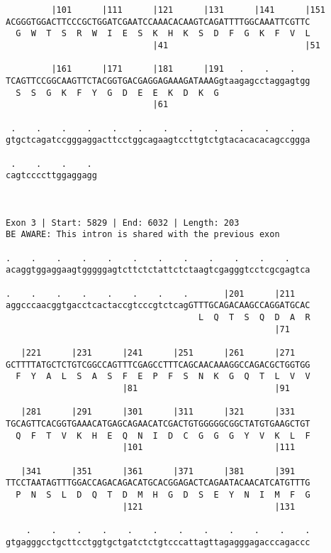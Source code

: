 \documentclass{article}
\begin{document}
\begin{Verbatim}
         |101      |111      |121      |131      |141      |151
ACGGGTGGACTTCCCGCTGGATCGAATCCAAACACAAGTCAGATTTTGGCAAATTCGTTC
  G  W  T  S  R  W  I  E  S  K  H  K  S  D  F  G  K  F  V  L
                             |41                           |51
  
         |161      |171      |181      |191   .    .    .   
TCAGTTCCGGCAAGTTCTACGGTGACGAGGAGAAAGATAAAGgtaagagcctaggagtgg
  S  S  G  K  F  Y  G  D  E  E  K  D  K  G                  
                             |61                            
  
 .    .    .    .    .    .    .    .    .    .    .    .   
gtgctcagatccgggaggacttcctggcagaagtccttgtctgtacacacacagccggga
                                                            
 .    .    .    . 
cagtccccttggaggagg
                  
                  
 
Exon 3 | Start: 5829 | End: 6032 | Length: 203
BE AWARE: This intron is shared with the previous exon
 
.    .    .    .    .    .    .    .    .    .    .    .    
acaggtggaggaagtgggggagtcttctctattctctaagtcgagggtcctcgcgagtca
                                                            
.    .    .    .    .    .    .    .       |201      |211   
aggcccaacggtgacctcactaccgtcccgtctcagGTTTGCAGACAAGCCAGGATGCAC
                                      L  Q  T  S  Q  D  A  R
                                                     |71    
  
   |221      |231      |241      |251      |261      |271   
GCTTTTATGCTCTGTCGGCCAGTTTCGAGCCTTTCAGCAACAAAGGCCAGACGCTGGTGG
  F  Y  A  L  S  A  S  F  E  P  F  S  N  K  G  Q  T  L  V  V
                       |81                           |91    
  
   |281      |291      |301      |311      |321      |331   
TGCAGTTCACGGTGAAACATGAGCAGAACATCGACTGTGGGGGCGGCTATGTGAAGCTGT
  Q  F  T  V  K  H  E  Q  N  I  D  C  G  G  G  Y  V  K  L  F
                       |101                          |111   
  
   |341      |351      |361      |371      |381      |391   
TTCCTAATAGTTTGGACCAGACAGACATGCACGGAGACTCAGAATACAACATCATGTTTG
  P  N  S  L  D  Q  T  D  M  H  G  D  S  E  Y  N  I  M  F  G
                       |121                          |131   
  
    .    .    .    .    .    .    .    .    .    .    .    .
gtgagggcctgcttcctggtgctgatctctgtcccattagttagagggagacccagaccc
                                                            

\end{Verbatim}
\end{document}
